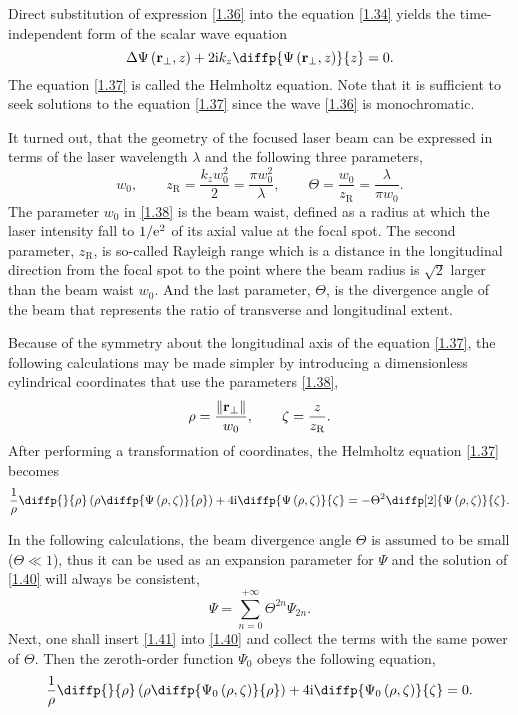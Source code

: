 Direct substitution of expression \ref{1.36} into the equation \ref{1.34} yields the time-independent form of the scalar wave equation
\begin{equation}
\label{1.37}
\laplace{\Psi \left(\vec{r_\bot}, z \right)} + 2 \i k_z \diffp{\Psi \left(\vec{r_\bot}, z \right)}{z} = 0.
\end{equation}
The equation \ref{1.37} is called the Helmholtz equation. Note that it is sufficient to seek solutions to the equation \ref{1.37} since the wave \ref{1.36} is monochromatic.

It turned out, that the geometry of the focused laser beam can be expressed in terms of the laser wavelength $ \lambda $ and the following three parameters,
\begin{equation}
\label{1.38}
w_0, \qquad z_{\mathrm{R}} = \frac{k_z w_0^2}{2} = \frac{\pi w_0^2}{\lambda}, \qquad \Theta = \frac{w_0}{z_\mathrm{R}} = \frac{\lambda}{\pi w_0}.
\end{equation}
The parameter $ w_0 $ in \ref{1.38} is the beam waist, defined as a radius at which the laser intensity fall to $ 1/\mathrm{e}^2 $ of its axial value at the focal spot. The second parameter, $ z_\mathrm{R} $, is so-called Rayleigh range which is a distance in the longitudinal direction from the focal spot to the point where the beam radius is $ \sqrt{2} $ larger than the beam waist $ w_0 $. And the last parameter, $ \Theta $, is the divergence angle of the beam that represents the ratio of transverse and longitudinal extent.

Because of the symmetry about the longitudinal axis of the equation \ref{1.37}, the following calculations may be made simpler by introducing a dimensionless cylindrical coordinates that use the parameters \ref{1.38},
\begin{equation}
\label{1.39}
\rho = \frac{\lVert\mathbf{r_\bot}\rVert}{w_0}, \qquad \zeta = \frac{z}{z_{\mathrm{R}}}.
\end{equation}
After performing a transformation of coordinates, the Helmholtz equation \ref{1.37} becomes 
\begin{equation}
\label{1.40}
\frac{1}{\rho} \diffp{}{\rho}\left(\rho \diffp{\Psi \left(\rho, \zeta \right)}{\rho} \right) + 4 \i \diffp{\Psi \left(\rho, \zeta \right)}{\zeta}  = - \Theta^2 \diffp[2]{\Psi \left(\rho, \zeta \right)}{\zeta}.
\end{equation}

In the following calculations, the beam divergence angle $ \Theta $ is assumed to be small ($ \Theta \ll 1 $), thus it can be used as an expansion parameter for $ \Psi $ and the solution of \ref{1.40} will always be consistent,
\begin{equation}
\label{1.41}
\Psi = \sum_{n = 0}^{+\infty} \Theta^{2n} \Psi_{2n}.
\end{equation}
Next, one shall insert \ref{1.41} into \ref{1.40} and collect the terms with the same power of $ \Theta $. Then the zeroth-order function $ \Psi_0 $ obeys the following equation,
\begin{equation}
\label{1.42}
\frac{1}{\rho} \diffp{}{\rho}\left(\rho \diffp{\Psi_0 \left(\rho, \zeta \right)}{\rho} \right) + 4 \i \diffp{\Psi_0\left(\rho, \zeta \right)}{\zeta} = 0.
\end{equation}

